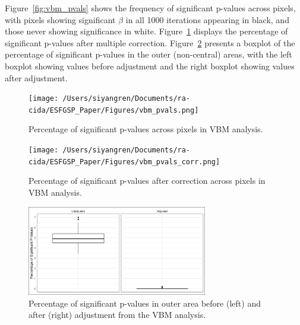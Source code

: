 \documentclass[12pt]{article}
\begin{document}
Figure~\ref{fig:vbm_pvals} shows the frequency of significant p-values across pixels, with pixels showing significant \( \beta \) in all 1000 iterations appearing in black, and those never showing significance in white.
Figure~\ref{fig:vbm_pvals_corr} displays the percentage of significant p-values after multiple correction.
Figure~\ref{fig:vbm_boxplots} presents a boxplot of the percentage of significant p-values in the outer (non-central) areas, with the left boxplot showing values before adjustment and the right boxplot showing values after adjustment.

\begin{figure}[h]
  \centering
  \begin{minipage}[b]{0.45\textwidth}
    \texttt{[image: /Users/siyangren/Documents/ra-cida/ESFGSP\_Paper/Figures/vbm\_pvals.png]}
    \caption{Percentage of significant p-values across pixels in VBM analysis.}
    \label{fig:vbm_pvals}
  \end{minipage}
  \hfill %
  \begin{minipage}[b]{0.45\textwidth}
    \texttt{[image: /Users/siyangren/Documents/ra-cida/ESFGSP\_Paper/Figures/vbm\_pvals\_corr.png]}
    \caption{Percentage of significant p-values after correction across pixels in VBM analysis.}
    \label{fig:vbm_pvals_corr}
  \end{minipage}
\end{figure}

\begin{figure}[h]
  \centering
  \includegraphics[width=0.7\textwidth]{../Figures/vbm_boxplots.png}
  \caption{Percentage of significant p-values in outer area before (left) and after (right) adjustment from the VBM analysis.}
  \label{fig:vbm_boxplots}
\end{figure}


\end{document}
